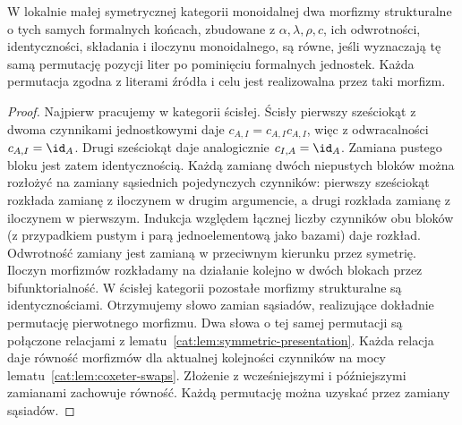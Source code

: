 \begin{twierdzenie}\label{cat:thm:symmetric-coherence}
W lokalnie małej symetrycznej kategorii monoidalnej dwa morfizmy strukturalne o tych samych formalnych końcach, zbudowane z $\alpha,\lambda,\rho,c$, ich odwrotności, identyczności, składania i iloczynu monoidalnego, są równe, jeśli wyznaczają tę samą permutację pozycji liter po pominięciu formalnych jednostek. Każda permutacja zgodna z literami źródła i celu jest realizowalna przez taki morfizm.
\end{twierdzenie}
\begin{proof}
Najpierw pracujemy w kategorii ścisłej. Ścisły pierwszy sześciokąt z dwoma czynnikami jednostkowymi daje $c_{A,I}=c_{A,I}c_{A,I}$, więc z odwracalności $c_{A,I}=\id_A$. Drugi sześciokąt daje analogicznie $c_{I,A}=\id_A$. Zamiana pustego bloku jest zatem identycznością.
Każdą zamianę dwóch niepustych bloków można rozłożyć na zamiany sąsiednich pojedynczych czynników: pierwszy sześciokąt rozkłada zamianę z iloczynem w drugim argumencie, a drugi rozkłada zamianę z iloczynem w pierwszym. Indukcja względem łącznej liczby czynników obu bloków (z przypadkiem pustym i parą jednoelementową jako bazami) daje rozkład. Odwrotność zamiany jest zamianą w przeciwnym kierunku przez symetrię. Iloczyn morfizmów rozkładamy na działanie kolejno w dwóch blokach przez bifunktorialność. W ścisłej kategorii pozostałe morfizmy strukturalne są identycznościami. Otrzymujemy słowo zamian sąsiadów, realizujące dokładnie permutację pierwotnego morfizmu. Dwa słowa o tej samej permutacji są połączone relacjami z lematu~\ref{cat:lem:symmetric-presentation}. Każda relacja daje równość morfizmów dla aktualnej kolejności czynników na mocy lematu~\ref{cat:lem:coxeter-swaps}. Złożenie z wcześniejszymi i późniejszymi zamianami zachowuje równość. Każdą permutację można uzyskać przez zamiany sąsiadów.


\end{proof}
